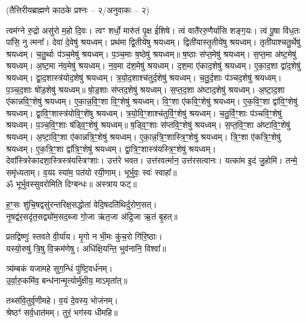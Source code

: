 \centerline{\scriptsize (तैत्तिरीयब्राह्मणे काठके प्रश्नः – २/अनुवाकः – २)}
त्वम॑ग्ने रु॒द्रो असु॑रो म॒हो दि॒वः। त्वꣳ शर्धो॒ मारु॑तं पृ॒क्ष ई॑शिषे।
त्वं वातै॑ररु॒णैर्या॑सि शङ्ग॒यः। त्वं पू॒षा वि॑ध॒तः पा॑सि॒ नु त्मना᳚।
देवा॑ दे॒वेषु॑ श्रयध्वम्। प्रथ॑मा द्वि॒तीये॑षु श्रयध्वम्।
द्विती॑यास्तृ॒तीये॑षु श्रयध्वम्। तृती॑याश्चतु॒र्थेषु॑ श्रयध्वम्।
च॒तु॒र्थाः प॑ञ्च॒मेषु॑ श्रयध्वम्। प॒ञ्च॒माः ष॒ष्ठेषु॑ श्रयध्वम्॥
ष॒ष्ठाः स॑प्त॒मेषु॑ श्रयध्वम्। स॒प्त॒मा अ॑ष्ट॒मेषु॑ श्रयध्वम्।
अ॒ष्ट॒मा न॑व॒मेषु॑ श्रयध्वम्। न॒व॒मा द॑श॒मेषु॑ श्रयध्वम्।
द॒श॒मा ए॑काद॒शेषु॑ श्रयध्वम्। ए॒का॒द॒शा द्वा॑द॒शेषु॑ श्रयध्वम्।
द्वा॒द॒शास्त्र॑योद॒शेषु॑ श्रयध्वम्। त्र॒यो॒द॒शाश्च॑तुर्द॒शेषु॑ श्रयध्वम्।
च॒तु॒र्द॒शाः प॑ञ्चद॒शेषु॑ श्रयध्वम्। प॒ञ्च॒द॒शाः षो॑ड॒शेषु॑ श्रयध्वम्॥
षो॒ड॒शाः स॑प्तद॒शेषु॑ श्रयध्वम्। स॒प्त॒द॒शा अ॑ष्टाद॒शेषु॑ श्रयध्वम्। अ॒ष्टा॒द॒शा ए॑कान्नवि॒ꣳ॒शेषु॑ श्रयध्वम्। ए॒का॒न्न॒वि॒ꣳ॒शा वि॒ꣳ॒शेषु॑ श्रयध्वम्। वि॒ꣳ॒शा ए॑कवि॒ꣳ॒शेषु॑ श्रयध्वम्। ए॒क॒वि॒ꣳ॒शा द्वा॑वि॒ꣳ॒शेषु॑ श्रयध्वम्। द्वा॒वि॒ꣳ॒शास्त्र॑योवि॒ꣳ॒शे॑षु श्रयध्वम्। त्र॒यो॒वि॒ꣳ॒शाश्च॑तुर्वि॒ꣳ॒शेषु॑ श्रयध्वम्। च॒तु॒र्वि॒ꣳ॒शाः प॑ञ्चवि॒ꣳ॒शेषु॑ श्रयध्वम्। प॒ञ्च॒वि॒ꣳ॒शाः ष॑ड्वि॒ꣳ॒शेषु॑ श्रयध्वम्॥
ष॒ड्वि॒ꣳ॒शाः स॑प्तवि॒ꣳ॒शेषु॑ श्रयध्वम्। स॒प्त॒वि॒ꣳ॒शा अ॑ष्टावि॒ꣳ॒शेषु॑ श्रयध्वम्।
अ॒ष्टा॒वि॒ꣳ॒शा ए॑कान्नत्रि॒ꣳ॒शेषु॑ श्रयध्वम्। ए॒का॒न्न॒त्रि॒ꣳ॒शास्त्रि॒ꣳ॒शेषु॑ श्रयध्वम्।
त्रि॒ꣳ॒शा ए॑कत्रि॒ꣳ॒शेषु॑ श्रयध्वम्। ए॒क॒त्रि॒ꣳ॒शा द्वा᳚त्रि॒ꣳ॒शेषु॑ श्रयध्वम्।
द्वा॒त्रि॒ꣳ॒शास्त्र॑यस्त्रि॒ꣳ॒शेषु॑ श्रयध्वम्। देवा᳚स्त्रिरेकादशा॒स्त्रिस्त्र॑यस्त्रिꣳशाः।
उत्त॑रे भवत। उत्त॑रवर्त्मान॒ उत्त॑रसत्वानः।
यत्का॑म इ॒दं जु॒होमि॑। तन्मे॒ समृ॑ध्यताम्।
व॒यꣴ स्या॑म॒ पत॑यो रयी॒णाम्। भूर्भुवः॒ स्वः॑ स्वाहा᳚॥\\
ॐ भूर्भुवस्सुवरोमिति दिग्बन्धः॥ अस्त्राय फट्॥


ह॒ꣳ॒सः शु॑चि॒षद्वसु॑रन्तरिक्ष॒सद्धोता॑ वेदि॒षदति॑थिर्दुरोण॒सत्।\\
नृ॒षद्व॑र॒सदृ॑त॒सद्व्यो॑म॒सद॒ब्जा गो॒जा ऋ॑त॒जा अ॑द्रि॒जा ऋ॒तं बृ॒हत्॥

प्रतद्विष्णुः॑ स्तवते वी॒र्या॑य। मृ॒गो न भी॒मः कु॑च॒रो गि॑रि॒ष्ठाः।\\
यस्यो॒रुषु॑ त्रि॒षु वि॒क्रम॑णेषु। अधि॑क्षि॒यन्ति॒ भुव॑नानि॒ विश्वा᳚॥

त्र्य॑म्बकं यजामहे सुग॒न्धिं पु॑ष्टि॒वर्ध॑नम्।\\
उ॒र्वा॒रु॒कमि॑व॒ बन्ध॑नान्मृ॒त्योर्मु॑क्षीय॒ माऽमृता᳚त्॥ 

तथ्स॑वि॒तुर्वृ॑णीमहे। व॒यं दे॒वस्य॒ भोज॑नम्‌।\\
श्रेष्ठꣳ॑ सर्व॒धात॑मम्‌। तुरं॒ भग॑स्य धीमहि॥ 

